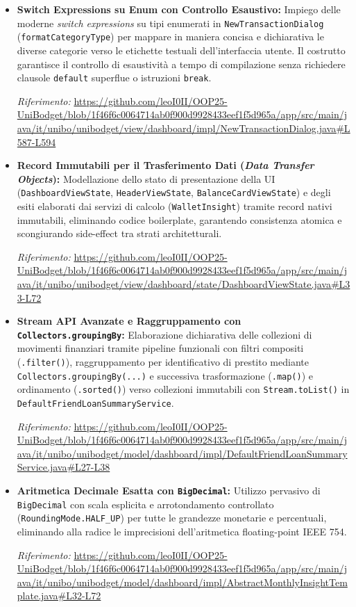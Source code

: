 \documentclass[11pt,a4paper,openright]{report}
\begin{document}
\begin{itemize}[itemsep=5pt,topsep=3pt]
  \item \textbf{Switch Expressions su Enum con Controllo Esaustivo:} Impiego delle moderne \emph{switch expressions} su tipi enumerati in \texttt{NewTransactionDialog} (\texttt{formatCategoryType}) per mappare in maniera concisa e dichiarativa le diverse categorie verso le etichette testuali dell'interfaccia utente. Il costrutto garantisce il controllo di esaustivit\`a a tempo di compilazione senza richiedere clausole \texttt{default} superflue o istruzioni \texttt{break}.
  \par\emph{Riferimento:} \url{https://github.com/leoI0II/OOP25-UniBodget/blob/1f46f6c0064714ab0f900d9928433eef1f5d965a/app/src/main/java/it/unibo/unibodget/view/dashboard/impl/NewTransactionDialog.java#L587-L594}

  \item \textbf{Record Immutabili per il Trasferimento Dati (\emph{Data Transfer Objects}):} Modellazione dello stato di presentazione della UI (\texttt{DashboardViewState}, \texttt{HeaderViewState}, \texttt{BalanceCardViewState}) e degli esiti elaborati dai servizi di calcolo (\texttt{WalletInsight}) tramite record nativi immutabili, eliminando codice boilerplate, garantendo consistenza atomica e scongiurando side-effect tra strati architetturali.
  \par\emph{Riferimento:} \url{https://github.com/leoI0II/OOP25-UniBodget/blob/1f46f6c0064714ab0f900d9928433eef1f5d965a/app/src/main/java/it/unibo/unibodget/view/dashboard/state/DashboardViewState.java#L33-L72}

  \item \textbf{Stream API Avanzate e Raggruppamento con \texttt{Collectors.groupingBy}:} Elaborazione dichiarativa delle collezioni di movimenti finanziari tramite pipeline funzionali con filtri compositi (\texttt{.filter()}), raggruppamento per identificativo di prestito mediante \texttt{Collectors.groupingBy(...)} e successiva trasformazione (\texttt{.map()}) e ordinamento (\texttt{.sorted()}) verso collezioni immutabili con \texttt{Stream.toList()} in \texttt{DefaultFriendLoanSummaryService}.
  \par\emph{Riferimento:} \url{https://github.com/leoI0II/OOP25-UniBodget/blob/1f46f6c0064714ab0f900d9928433eef1f5d965a/app/src/main/java/it/unibo/unibodget/model/dashboard/impl/DefaultFriendLoanSummaryService.java#L27-L38}

  \item \textbf{Aritmetica Decimale Esatta con \texttt{BigDecimal}:} Utilizzo pervasivo di \texttt{BigDecimal} con scala esplicita e arrotondamento controllato (\texttt{RoundingMode.HALF\_UP}) per tutte le grandezze monetarie e percentuali, eliminando alla radice le imprecisioni dell'aritmetica floating-point IEEE 754.
  \par\emph{Riferimento:} \url{https://github.com/leoI0II/OOP25-UniBodget/blob/1f46f6c0064714ab0f900d9928433eef1f5d965a/app/src/main/java/it/unibo/unibodget/model/dashboard/impl/AbstractMonthlyInsightTemplate.java#L32-L72}
\end{itemize}
\end{document}

